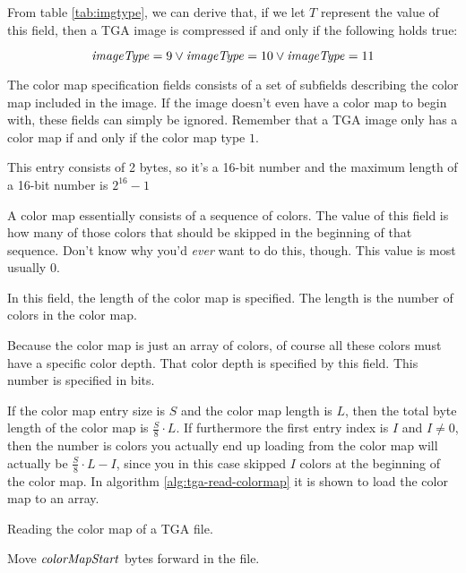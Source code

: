 From table \ref{tab:imgtype}, we can derive that, if we let $T$
represent the value of this field, then a TGA image is compressed if
and only if the following holds true:

\begin{equation*}
  \mathit{imageType} = 9 \vee \mathit{imageType} = 10 \vee \mathit{imageType} = 11
\end{equation*}


The color map specification fields consists of a set of subfields
describing the color map included in the image. If the image doesn't
even have a color map to begin with, these fields can simply be
ignored. Remember that a TGA image only has a color map if and only if
the color map type $1$.


This entry consists of 2 bytes, so it's a 16-bit number and the
maximum length of a 16-bit number is $2^{16} - 1$

A color map essentially consists of a sequence of colors. The value
of this field is how many of those colors that should be skipped in
the beginning of that sequence. Don't know why you'd \textit{ever}
want to do this, though. This value is most usually $0$.


In this field, the length of the color map is specified. The
length is the number of colors in the color map.


Because the color map is just an array of colors, of course all
these colors must have a specific color depth. That color depth is
specified by this field. This number is specified in bits.

If the color map entry size is $S$ and the color map length is $L$,
then the total byte length of the color map is $\frac{S}{8} \cdot
L$. If furthermore the first entry index is $I$ and $I \neq 0$, then
the number is colors you actually end up loading from the color map
will actually be $\frac{S}{8} \cdot L - I$, since you in this case
skipped $I$ colors at the beginning of the color map. In algorithm
\ref{alg:tga-read-colormap} it is shown to load the color map to an
array.

\begin{algorithm}[H]
  \caption{Reading the color map of a TGA file.}
  \label{alg:tga-read-colormap}
  \begin{algorithmic}[1]

    \State Move $\mathit{colorMapStart}$ bytes forward in the file.

    \EndFor
    \end{algorithmic}
  \end{algorithm}


